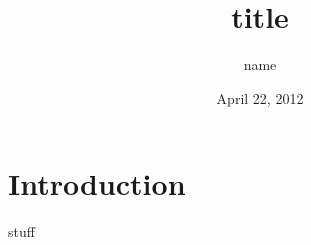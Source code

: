 \documentclass[12pt]{article}
\author{name}
\title{title }
\date{April 22, 2012}
\begin{document}

\tableofcontents
\pagebreak
\section{Introduction}
stuff
\end{document}

